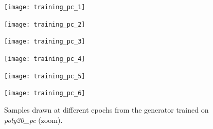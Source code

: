 \begin{figure}[ht]
    \centering
    \begin{minipage}{0.32\textwidth}
        \centering
        \texttt{[image: training\_pc\_1]}
    \end{minipage}
    \begin{minipage}{0.32\textwidth}
        \centering
        \texttt{[image: training\_pc\_2]}
    \end{minipage}
    \begin{minipage}{0.32\textwidth}
        \centering
        \texttt{[image: training\_pc\_3]}
    \end{minipage}
    \vspace{0.3cm}
    \begin{minipage}{0.32\textwidth}
        \centering
        \texttt{[image: training\_pc\_4]}
    \end{minipage}
    \begin{minipage}{0.32\textwidth}
        \centering
        \texttt{[image: training\_pc\_5]}
    \end{minipage}
    \begin{minipage}{0.32\textwidth}
        \centering
        \texttt{[image: training\_pc\_6]}
    \end{minipage}
    \caption{Samples drawn at different epochs from the generator trained on \textit{poly20\_pc} (zoom).}
\end{figure}
